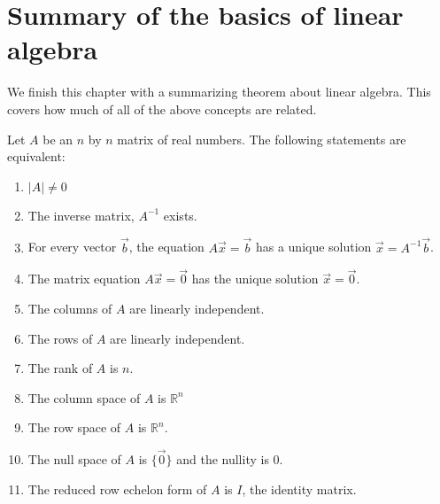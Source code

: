 \section{Summary of the basics of  linear algebra}  
\label{sect:linear:algebra:summary}

We finish this chapter with a summarizing theorem about linear algebra.   This covers how much of all of the above concepts are related.   



\begin{theorem} \label{thm:nonsing:matrices}
 Let $A$ be an $n$ by $n$ matrix of real numbers.   The following statements are equivalent:
 
\begin{enumerate}
 \item $|A| \neq 0$ 
 \item The inverse matrix, $A^{-1}$ exists. 
 \item For every vector $\vec{b}$, the equation $A \vec{x}=\vec{b}$ has a unique solution $\vec{x} = A^{-1} \vec{b}$. 
 \item The matrix equation $A \vec{x} = \vec{0}$ has the unique solution $\vec{x} = \vec{0}$.  
 \item The columns of $A$ are linearly independent.
 \item The rows of $A$ are linearly independent.  
 \item The rank of $A$ is $n$.  
 \item The column space of $A$ is $\mathbb{R}^n$ 
 \item The row space of $A$ is $\mathbb{R}^n$.  
 \item The null space of $A$ is $\{\vec{0}\}$ and the nullity is 0.    
 \item The reduced row echelon form of $A$ is $I$, the identity matrix. 
\end{enumerate}
\end{theorem}

